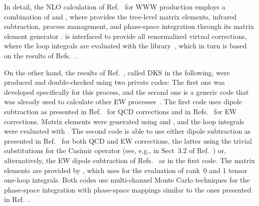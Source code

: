 In detail, the NLO calculation of Ref.~\cite{Schonherr:2018jva} for WWW production
employs a combination of \Sherpa 
\cite{Bothmann:2019yzt,Gleisberg:2008ta,Bothmann:2016nao,Hoeche:2014rya} 
and \Recola \cite{Actis:2012qn,Actis:2016mpe}, where
\Sherpa provides the tree-level matrix elements, 
infrared subtraction, process management, and phase-space 
integration through its matrix element generator \Amegic 
\cite{Krauss:2001iv,Gleisberg:2007md,Schonherr:2017qcj}. 
\Recola is interfaced \cite{Biedermann:2017yoi} to provide 
all renormalized virtual corrections, where the loop integrals are evaluated with the
\Collier library~\cite{Denner:2016kdg},
which in turn is based on the results of 
Refs.~\cite{Denner:2002ii,Denner:2005nn,Denner:2010tr}.

On the other hand, the results of Ref.~\cite{Dittmaier:2019twg}, called DKS in the following,
were produced and double-checked using two private codes: 
The first one was developed specifically for this process, 
and the second one is a generic code that was already used to calculate other EW 
processes~\cite{Ballestrero:2018anz,Denner:2019tmn,Denner:2019zfp}.
The first code uses dipole subtraction as presented in Ref.~\cite{Catani:1996vz} for QCD corrections and 
in Refs.~\cite{Dittmaier:1999mb,Dittmaier:2008md} for EW corrections.
Matrix elements were generated using \Madgraph \cite{Alwall:2014hca} and \Recola,
and the loop integrals were evaluated with \Collier.
The second code is able to use either dipole subtraction as presented in Ref.~\cite{Catani:1996vz} 
for both QCD and EW corrections, the latter using the trivial substitutions for the Casimir operator 
(see, e.g., in Sect~3.2 of Ref.~\cite{Kallweit:2014xda}) or, alternatively, 
the EW dipole subtraction of Refs.~\cite{Dittmaier:1999mb,Dittmaier:2008md} 
as in the first code.
The matrix elements are provided by \OpenLoops \cite{Cascioli:2011va,Kallweit:2014xda,Buccioni:2019sur}, 
which uses \Collier for the evaluation of rank~0 and 1 tensor one-loop integrals.
Both codes use multi-channel Monte Carlo techniques \cite{Hilgart:1992xu,Kleiss:1994qy} for the phase-space integration with phase-space mappings similar to the ones presented in Ref.~\cite{Dittmaier:2002ap}.

